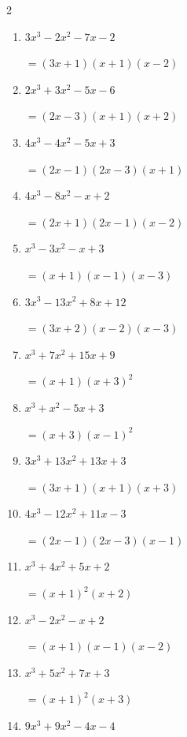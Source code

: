 \begin{multicols}{2}
\begin{enumerate}
  \item $3x^{3}-2x^{2}-7x-2$

        $=(3x+1)(x+1)(x-2)$

  \item $2x^{3}+3x^{2}-5x-6$

        $=(2x-3)(x+1)(x+2)$

  \item $4x^{3}-4x^{2}-5x+3$

        $=(2x-1)(2x-3)(x+1)$

  \item $4x^{3}-8x^{2}-x+2$

        $=(2x+1)(2x-1)(x-2)$

  \item $x^{3}-3x^{2}-x+3$

        $=(x+1)(x-1)(x-3)$

\columnbreak %

  \item $3x^{3}-13x^{2}+8x+12$

        $=(3x+2)(x-2)(x-3)$

  \item $x^{3}+7x^{2}+15x+9$

        $=(x+1)(x+3) ^{ 2 }$

  \item $x^{3}+x^{2}-5x+3$

        $=(x+3)(x-1) ^{ 2 }$

  \item $3x^{3}+13x^{2}+13x+3$

        $=(3x+1)(x+1)(x+3)$

  \item $4x^{3}-12x^{2}+11x-3$

        $=(2x-1)(2x-3)(x-1)$

\columnbreak %

\resetques

  \item $x^{3}+4x^{2}+5x+2$

        $=(x+1) ^{ 2 }(x+2)$

  \item $x^{3}-2x^{2}-x+2$

        $=(x+1)(x-1)(x-2)$

  \item $x^{3}+5x^{2}+7x+3$

        $=(x+1) ^{ 2 }(x+3)$

  \item $9x^{3}+9x^{2}-4x-4$


\end{enumerate}
\end{multicols}
